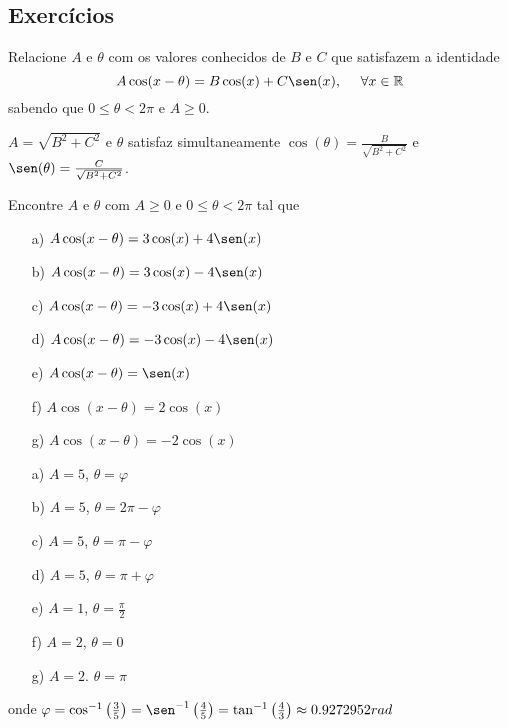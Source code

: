 \subsection*{Exercícios}
\begin{exer}
Relacione $A$ e $\theta$ com os valores conhecidos de $B$ e $C$ que satisfazem a identidade
\begin{equation}A\cos(x-\theta)=B\cos(x)+C\sen(x),~~~~\forall x\in\mathbb{R}\end{equation}
sabendo que $0\leq \theta<2\pi$ e $A\geq 0$.
\end{exer}
\begin{resp}
$A=\sqrt{B^2+C^2}$ e $\theta$ satisfaz simultaneamente $\cos(\theta)=\frac{B}{\sqrt{B^2+C^2}}$ e $\sen(\theta)=\frac{C}{\sqrt{B^2+C^2}}$.
\end{resp}
\begin{exer} Encontre $A$ e $\theta$ com $A\geq 0$ e  $0\leq \theta<2\pi$ tal que
\begin{itemize}
 \item [a)] $A\cos(x-\theta)=3\cos(x)+4\sen(x)$
 \item [b)] $A\cos(x-\theta)=3\cos(x)-4\sen(x)$
 \item [c)] $A\cos(x-\theta)=-3\cos(x)+4\sen(x)$
 \item [d)] $A\cos(x-\theta)=-3\cos(x)-4\sen(x)$
 \item [e)] $A\cos(x-\theta)=\sen(x)$
 \item [f)] $A\cos(x-\theta)=2\cos(x)$
 \item [g)] $A\cos(x-\theta)=-2\cos(x)$
 \end{itemize}
\end{exer}
\begin{resp}
\begin{itemize}
 \item [a)] $A=5$, $\theta=\varphi$
 \item [b)] $A=5$, $\theta=2\pi-\varphi$
 \item [c)] $A=5$, $\theta=\pi-\varphi$
 \item [d)] $A=5$, $\theta=\pi+\varphi$
 \item [e)] $A=1$, $\theta=\frac{\pi}{2}$
 \item [f)] $A=2$, $\theta=0$
 \item [g)] $A=2$. $\theta=\pi$
 \end{itemize}
 onde $\varphi=\cos^{-1}\left(\frac{3}{5}\right)=\sen^{-1}\left(\frac{4}{5}\right)=\tan^{-1}\left(\frac{4}{3}\right)\approx 0.9272952rad $
\end{resp}
